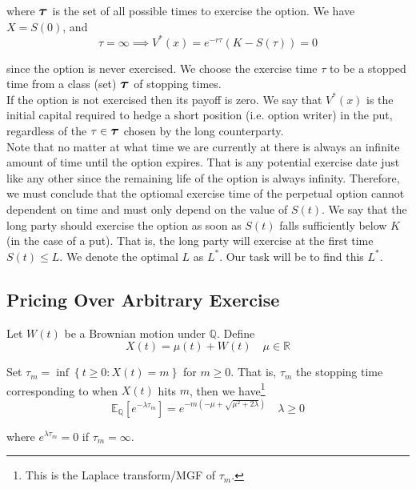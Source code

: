 \documentclass[12pt]{article}
\newlength\tindent
\renewcommand{\indent}{\hspace*{\tindent}}
\newcommand{\R}{\mathbb R}
\newcommand{\Q}{\mathbb Q}
\newcommand{\E}{\mathbb E}
\newcommand{\bigtau}{\text{{\large $\bm \tau$}}}
\begin{document}
where $\bigtau$ is the set of all possible times to exercise the option. We have $X = S(0)$, and
\begin{equation*}
	\tau = \infty \implies V^*(x) = e^{-r\tau} \left(K - S(\tau) \right) = 0
\end{equation*}

since the option is never exercised. We choose the exercise time $\tau$ to be a stopped time from a class (set) $\bigtau$ of stopping times. \\

\indent If the option is not exercised then its payoff is zero. We say that $V^*(x)$ is the initial capital required to hedge a short position (i.e. option writer) in the put, regardless of the $\tau \in \bigtau$ chosen by the long counterparty. \\

\indent Note that no matter at what time we are currently at there is always an infinite amount of time until the option expires. That is any potential exercise date just like any other since the remaining life of the option is always infinity. Therefore, we must conclude that the optiomal exercise time of the perpetual option cannot dependent on time and must only depend on the value of $S(t)$. We say that the long party should exercise the option as soon as $S(t)$ falls sufficiently below $K$ (in the case of a put). That is, the long party will exercise at the first time $S(t) \leq L$. We denote the optimal $L$ as $L^*$. Our task will be to find this $L^*$.

\subsection{Pricing Over Arbitrary Exercise}

Let $W(t)$ be a Brownian motion under $\Q$. Define
\begin{equation*}
	X(t) = \mu(t) + W(t) \quad \mu \in \R
\end{equation*}

\indent Set $\tau_m = \inf \left\{ t \geq 0: X(t) = m \right\}$ for $m \geq 0$. That is, $\tau_m$ the stopping time corresponding to when $X(t)$ hits $m$, then we have\footnote{This is the Laplace transform/MGF of $\tau_m$.}
\begin{equation*}
	\E_\Q \left[ e^{-\lambda \tau_m} \right] = e^{-m \left( -\mu + \sqrt{\mu^2 + 2\lambda} \right)} \quad \lambda \geq 0
\end{equation*}

where $e^{\lambda \tau_m} = 0$ if $\tau_m = \infty$.
\end{document}
